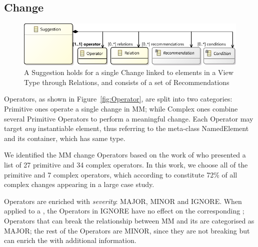 \subsection{Change}
\label{sec:Suggestion:Change}

\begin{figure}[t]
    \centering
     \includegraphics[width=\columnwidth]{images/Suggestion.pdf}
    \caption{A \textsf{Suggestion} holds for a single \textsf{Change} linked to 
		elements in a View Type through \textsf{Relation}s, and consists of a set of \textsf{Recommendation}s}
		\label{fig:Suggestion}
\end{figure}

\textsf{Operator}s, as shown in Figure~\ref{fig:Operator}, are split into two categories:
\textsf{Primitive} ones operate a single change in \textsf{MM}; while
\textsf{Complex} ones combine several \textsf{Primitive} \textsf{Operator}s
to perform a meaningful change. 
Each \textsf{Operator} may target \emph{any} instantiable \metamodel element, 
thus referring to the meta-class \textsf{NamedElement} and its container, which has same type.

We identified the MM change \textsf{Operator}s based on the work of \textcite{herrmannsdoerfer_extensive_2011} who presented a list of 27 primitive and 34 complex operators. In this work, we choose all of the primitive and 7 complex operators, which according to \textcite{khelladi_detecting_2015} constitute 72\% of all complex changes appearing in a large case study. 


\textsf{Operator}s are enriched with \emph{severity}: \textsf{MAJOR}, 
\textsf{MINOR} and \textsf{IGNORE}. 
When applied to a \metamodel, the \textsf{Operator}s in \textsf{IGNORE} have no 
effect on the corresponding \viewtypes; \textsf{Operator}s that can break the 
relationship between \textsf{MM} and its \viewtypes are categorised as \textsf{MAJOR}; 
the rest of the \textsf{Operator}s are \textsf{MINOR}, since they are not 
breaking but can enrich the \viewtypes with additional information.

